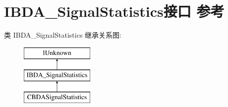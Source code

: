 \hypertarget{interface_i_b_d_a___signal_statistics}{}\section{I\+B\+D\+A\+\_\+\+Signal\+Statistics接口 参考}
\label{interface_i_b_d_a___signal_statistics}
类 I\+B\+D\+A\+\_\+\+Signal\+Statistics 继承关系图\+:\begin{figure}[H]
\begin{center}
\leavevmode
\includegraphics[height=3.000000cm]{interface_i_b_d_a___signal_statistics}
\end{center}
\end{figure}
